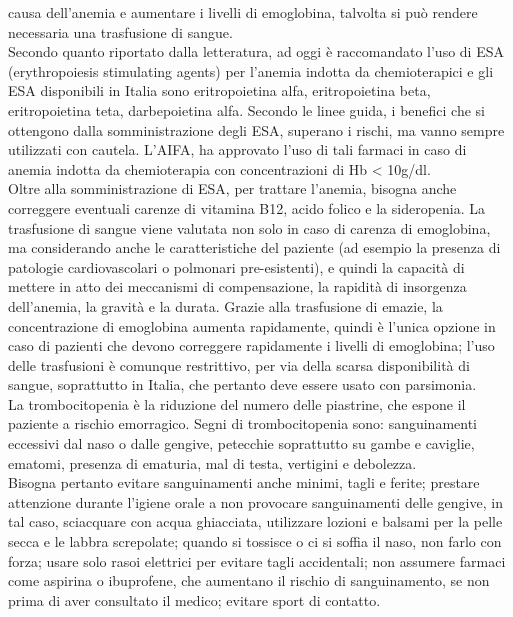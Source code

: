 causa dell’anemia e aumentare i livelli di emoglobina, talvolta si può rendere necessaria una trasfusione di sangue\cite{AMERICANLOWCELLS}.\\
Secondo quanto riportato dalla letteratura, ad oggi è raccomandato l’uso di ESA (erythropoiesis stimulating agents) 
per l’anemia indotta da chemioterapici e gli ESA disponibili in Italia sono eritropoietina alfa, eritropoietina beta, 
eritropoietina teta, darbepoietina alfa. Secondo le linee guida, i benefici che si ottengono dalla somministrazione 
degli ESA, superano i rischi, ma vanno sempre utilizzati con cautela. L’AIFA, ha approvato l’uso di tali farmaci 
in caso di anemia indotta da chemioterapia con concentrazioni di Hb < 10g/dl\cite{AIOMTOSS}.\\
Oltre alla somministrazione di ESA, per trattare l’anemia, bisogna anche correggere eventuali carenze di vitamina B12, 
acido folico e la sideropenia. La trasfusione di sangue viene valutata non solo in caso di carenza di emoglobina, 
ma considerando anche le caratteristiche del paziente (ad esempio la presenza di patologie cardiovascolari o 
polmonari pre-esistenti), e quindi la capacità di mettere in atto dei meccanismi di compensazione, la rapidità di 
insorgenza dell’anemia, la gravità e la durata. Grazie alla trasfusione di emazie, la concentrazione di emoglobina 
aumenta rapidamente, quindi è l’unica opzione in caso di pazienti che devono correggere rapidamente i livelli di 
emoglobina; l’uso delle trasfusioni è comunque restrittivo, per via della scarsa disponibilità di sangue, 
soprattutto in Italia, che pertanto deve essere usato con parsimonia\cite{AIOMTOSS}.\\
La trombocitopenia è la riduzione del numero delle piastrine, che espone il paziente a rischio emorragico. 
Segni di trombocitopenia sono: sanguinamenti eccessivi dal naso o dalle gengive, petecchie soprattutto su 
gambe e caviglie, ematomi, presenza di ematuria, mal di testa, vertigini e debolezza\cite{LLSLOWCELLS}.\\
Bisogna pertanto evitare sanguinamenti anche minimi, tagli e ferite; prestare attenzione durante l’igiene orale a non 
provocare sanguinamenti delle gengive, in tal caso, sciacquare con acqua ghiacciata, utilizzare lozioni e balsami 
per la pelle secca e le labbra screpolate; quando si tossisce o ci si soffia il naso, non farlo con forza; 
usare solo rasoi elettrici per evitare tagli accidentali; non assumere farmaci come aspirina o ibuprofene, 
che aumentano il rischio di sanguinamento, se non prima di aver consultato il medico; evitare sport di contatto\cite{AMERICANPLATELET}.\\

